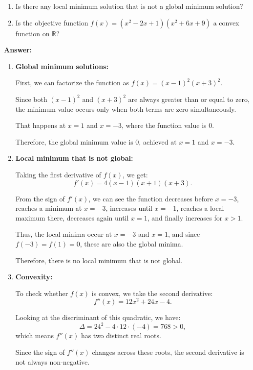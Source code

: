 \documentclass{article}
\begin{document}
\begin{enumerate}
\begin{enumerate}
    \item Is there any local minimum solution that is not a global minimum solution?
    
    \item Is the objective function $f(x)=(x^2 - 2x + 1)(x^2 + 6x + 9)$ a convex function on $\mathbb{R}$?
\end{enumerate}

\textbf{Answer:}

\begin{enumerate}
    \item \textbf{Global minimum solutions:}
    
    First, we can factorize the function as $f(x) = (x-1)^2(x+3)^2$.
    
    Since both $(x-1)^2$ and $(x+3)^2$ are always greater than or equal to zero, the minimum value occurs only when both terms are zero simultaneously.
    
    That happens at $x = 1$ and $x = -3$, where the function value is 0.
    
    Therefore, the global minimum value is 0, achieved at $x = 1$ and $x = -3$.
    
    \item \textbf{Local minimum that is not global:}
    
    Taking the first derivative of $f(x)$, we get:
    $$f'(x) = 4(x-1)(x+1)(x+3).$$
    
    From the sign of $f'(x)$, we can see the function decreases before $x=-3$, reaches a minimum at $x=-3$, increases until $x=-1$, reaches a local maximum there, decreases again until $x=1$, and finally increases for $x>1$.
    
    Thus, the local minima occur at $x=-3$ and $x=1$, and since $f(-3)=f(1)=0$, these are also the global minima.
    
    Therefore, there is no local minimum that is not global.
    
    \item \textbf{Convexity:}
    
    To check whether $f(x)$ is convex, we take the second derivative:
    $$f''(x) = 12x^2 + 24x - 4.$$
    
    Looking at the discriminant of this quadratic, we have:
    $$\Delta = 24^2 - 4 \cdot 12 \cdot (-4) = 768 > 0,$$
    which means $f''(x)$ has two distinct real roots.
    
    Since the sign of $f''(x)$ changes across these roots, the second derivative is not always non-negative.
    

\end{enumerate}
\end{enumerate}
\end{document}
